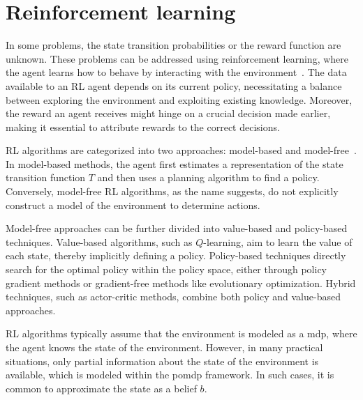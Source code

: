 \section{Reinforcement learning}
In some problems, the state transition probabilities or the reward function are unknown. These problems can be addressed using reinforcement learning, where the agent learns how to behave by interacting with the environment~\cite[Ch. 5]{Kochenderfer2015}. The data available to an RL agent depends on its current policy, necessitating a balance between exploring the environment and exploiting existing knowledge. Moreover, the reward an agent receives might hinge on a crucial decision made earlier, making it essential to attribute rewards to the correct decisions.

RL algorithms are categorized into two approaches: model-based and model-free~\cite[Ch. 5]{Kochenderfer2015}. In model-based methods, the agent first estimates a representation of the state transition function $T$ and then uses a planning algorithm to find a policy. Conversely, model-free RL algorithms, as the name suggests, do not explicitly construct a model of the environment to determine actions.

Model-free approaches can be further divided into value-based and policy-based techniques. Value-based algorithms, such as $Q$-learning, aim to learn the value of each state, thereby implicitly defining a policy. Policy-based techniques directly search for the optimal policy within the policy space, either through policy gradient methods or gradient-free methods like evolutionary optimization. Hybrid techniques, such as actor-critic methods, combine both policy and value-based approaches.

RL algorithms typically assume that the environment is modeled as a \gls{mdp}, where the agent knows the state of the environment. However, in many practical situations, only partial information about the state of the environment is available, which is modeled within the \gls{pomdp} framework. In such cases, it is common to approximate the state as a belief $b$. 



